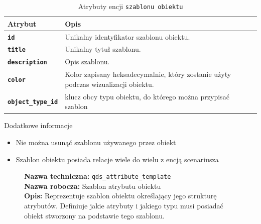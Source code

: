 \begin{table}[H]
    \centering
    \renewcommand{\arraystretch}{1.6}
    \begin{tabular}{|>{\bfseries}l|p{}|}
        \hline
        \rowcolor[HTML]{EFEFEF} \textbf{Atrybut} & \textbf{Opis} \\
        \hline
        \texttt{id} & Unikalny identyfikator szablonu obiektu. \\
        \hline
        \texttt{title} & Unikalny tytuł szablonu. \\
        \hline
        \texttt{description} & Opis szablonu. \\
        \hline
        \texttt{color} & Kolor zapisany heksadecymalnie, który zostanie użyty podczas wizualizacji obiektu. \\
        \hline
        \texttt{object\_type\_id} & klucz obcy typu obiektu, do którego można przypisać szablon \\
        \hline
    \end{tabular}
    \caption{Atrybuty encji \texttt{szablonu obiektu}}
\end{table}

Dodatkowe informacje
\begin{itemize}
    \item Nie można usunąć szablonu używanego przez obiekt
    \item Szablon obiektu posiada relacje wiele do wielu z encją scenariusza
\end{itemize}

\begin{figure}[H]
    \centering
    \begin{minipage}{0.8\textwidth}
        \begin{framed}
            \noindent\textbf{\large Nazwa techniczna:} \texttt{qds\_attribute\_template} \\
            \textbf{\large Nazwa robocza:} Szablon atrybutu obiektu \\
            \textbf{\large Opis:} Reprezentuje szablon obiektu określający jego strukturę atrybutów.
            Definiuje jakie atrybuty i jakiego typu musi posiadać obiekt stworzony na podstawie tego szablonu.
        \end{framed}
    \end{minipage}
\end{figure}

